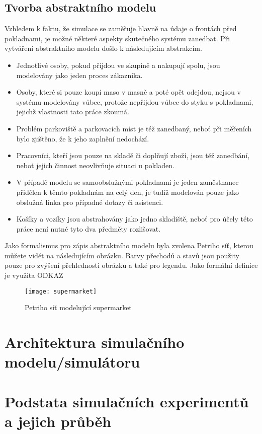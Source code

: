 \documentclass[12pt,a4paper,titlepage]{article}
\begin{document}
\subsection{Tvorba abstraktního modelu}
Vzhledem k faktu, že simulace se zaměřuje hlavně na údaje o frontách před pokladnami, je možné některé aspekty skutečného systému zanedbat. Při vytváření abstraktního modelu došlo k následujícím abstrakcím. 
\begin{itemize}
\item Jednotlivé osoby, pokud přijdou ve skupině a nakupují spolu, jsou modelovány jako jeden proces zákazníka.
\item Osoby, které si pouze koupí maso v masně a poté opět odejdou, nejsou v systému modelovány vůbec, protože nepřijdou vůbec do styku s pokladnami, jejichž vlastnosti tato práce zkoumá. 
\item Problém parkoviště a parkovacích míst je též zanedbaný, neboť při měřeních bylo zjištěno, že k jeho zaplnění nedochází.
\item Pracovníci, kteří jsou pouze na skladě či doplňují zboží, jsou též zanedbání, neboť jejich činnost neovlivňuje situaci u pokladen. 
\item V případě modelu se samoobslužnými pokladnami je jeden zaměstnanec přidělen k těmto pokladnám na celý den, je tudíž modelován pouze jako obslužná linka pro případné dotazy či asistenci.
\item Košíky a vozíky jsou abstrahovány jako jedno skladiště, neboť pro účely této práce není nutné tyto dva předměty rozlišovat.   
\end{itemize}

Jako formalismus pro zápis abstraktního modelu byla zvolena Petriho síť, kterou můžete vidět na následujícím obrázku. Barvy přechodů a stavů jsou použity pouze pro zvýšení přehlednosti obrázku a také pro legendu. Jako formální definice je využita ODKAZ  \\

\begin{figure}[h]
\centering
\texttt{[image: supermarket]}
\caption{Petriho síť modelující supermarket}
\end{figure}
\section{Architektura simulačního modelu/simulátoru}
\section{Podstata simulačních experimentů a jejich průběh}
\end{document}
